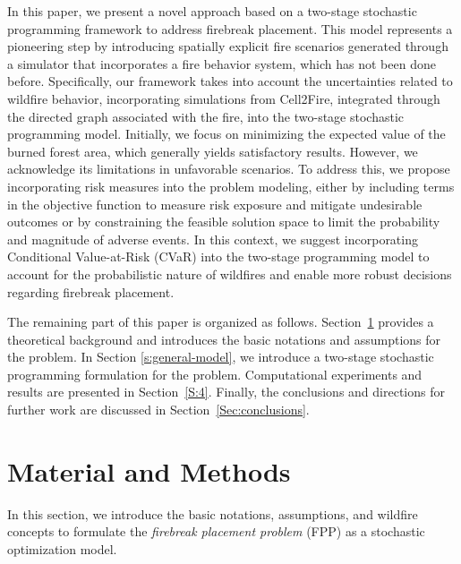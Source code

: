 \documentclass[a4paper,fleqn]{cas-sc}
\begin{document}
In this paper, we present a novel approach based on a two-stage stochastic programming framework to address firebreak placement. This model represents a pioneering step by introducing spatially explicit fire scenarios generated through a simulator that incorporates a fire behavior system, which has not been done before. Specifically, our framework takes into account the uncertainties related to wildfire behavior, incorporating simulations from Cell2Fire, integrated through the directed graph associated with the fire, into the two-stage stochastic programming model. Initially, we focus on minimizing the expected value of the burned forest area, which generally yields satisfactory results. However, we acknowledge its limitations in unfavorable scenarios. To address this, we propose incorporating risk measures into the problem modeling, either by including terms in the objective function to measure risk exposure and mitigate undesirable outcomes or by constraining the feasible solution space to limit the probability and magnitude of adverse events. In this context, we suggest incorporating Conditional Value-at-Risk (CVaR) into the two-stage programming model to account for the probabilistic nature of wildfires and enable more robust decisions regarding firebreak placement. 

The remaining part of this paper is organized as follows. Section~\ref{sec2} provides a theoretical background and introduces the basic notations and assumptions for the problem. In Section \ref{s:general-model}, we introduce a two-stage stochastic programming formulation for the problem. Computational experiments and results are presented in Section~\ref{S:4}. Finally, the conclusions and directions for further work are discussed in Section~\ref{Sec:conclusions}.

\section{Material and Methods}\label{sec2}

In this section, we introduce the basic notations, assumptions, and wildfire concepts to formulate the \textit{firebreak placement problem} (FPP) as a stochastic optimization model.
\end{document}
